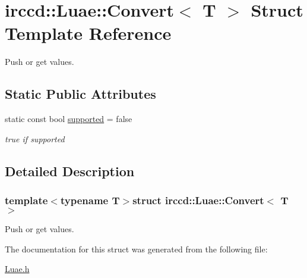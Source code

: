 \hypertarget{a00007}{\section{irccd\-:\-:Luae\-:\-:Convert$<$ T $>$ Struct Template Reference}
\label{a00007}
}


Push or get values.  


\subsection*{Static Public Attributes}
\begin{DoxyCompactItemize}
\item 
\hypertarget{a00007_aba86e75210c8947d9156a7a50f6e8f6c}{static const bool \hyperlink{a00007_aba86e75210c8947d9156a7a50f6e8f6c}{supported} = false}\label{a00007_aba86e75210c8947d9156a7a50f6e8f6c}

\begin{DoxyCompactList}\small\item\em true if supported \end{DoxyCompactList}\end{DoxyCompactItemize}


\subsection{Detailed Description}
\subsubsection*{template$<$typename T$>$struct irccd\-::\-Luae\-::\-Convert$<$ T $>$}

Push or get values. 

The documentation for this struct was generated from the following file\-:\begin{DoxyCompactItemize}
\item 
\hyperlink{a00089}{Luae.\-h}\end{DoxyCompactItemize}
